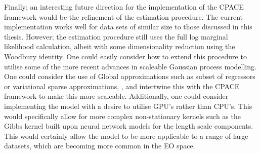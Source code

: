Finally; an interesting future direction for the implementation of the CPACE framework would be the refinement of the estimation procedure.
The current implementation works well for data sets of similar size to those discussed in this thesis.
However; the estimation procedure still uses the full log marginal likelihood calculation, albeit with some dimensionality reduction using the Woodbury identity.
One could easily consider how to extend this procedure to utilise some of the more recent advances in scaleable Gaussian process modelling.
One could consider the use of Global approximations such as subset of regressors or variational sparse approximations, \citep{liu_when_2019}, and intertwine this with the CPACE framework to make this more scaleable.
Additionally, one could consider implementing the model with a desire to utilise GPU's rather than CPU's.
This would specifically allow for more complex non-stationary kernels such as the Gibbs kernel built upon neural network models for the length scale components.
This would certainly allow the model to be more applicable to a range of large datasets, which are becoming more common in the EO space.
